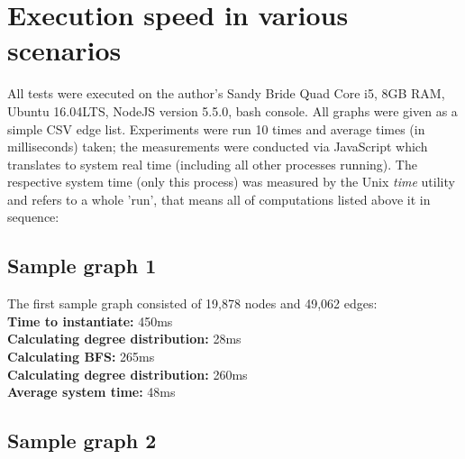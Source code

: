 %	
%	
%	
	

\section{Execution speed in various scenarios}
\label{sect:performance}

	All tests were executed on the author's Sandy Bride Quad Core i5, 8GB RAM, Ubuntu 16.04LTS, NodeJS version 5.5.0, bash console. All graphs were given as a simple CSV edge list. Experiments were run 10 times and average times (in milliseconds) taken; the measurements were conducted via JavaScript which translates to system real time (including all other processes running). The respective system time (only this process) was measured by the Unix \textit{time} utility and refers to a whole 'run', that means all of computations listed above it in sequence:
	
	\subsection{Sample graph 1}
	\label{ssect:sample_graph_1}
	
	The first sample graph consisted of 19,878 nodes and 49,062 edges:\\
	\textbf{Time to instantiate:} 450ms\\
	\textbf{Calculating degree distribution:} 28ms\\
	\textbf{Calculating BFS:} 265ms\\
	\textbf{Calculating degree distribution:} 260ms\\
	\textbf{Average system time:} 48ms
	
	\subsection{Sample graph 2}
	\label{ssect:sample_graph_2}
	
